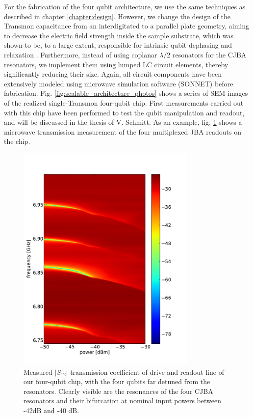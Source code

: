 For the fabrication of the four qubit architecture, we use the same techniques as described in chapter \ref{chapter:design}. However, we change the design of the Transmon capacitance from an interdigitated to a parallel plate geometry, aiming to decrease the electric field strength inside the sample substrate, which was shown to be, to a large extent, responsible for intrinsic qubit dephasing and relaxation \citep{paik_observation_2011}. Furthermore, instead of using coplanar $\lambda/2$ resonators for the CJBA resonators, we implement them using lumped LC circuit elements, thereby significantly reducing their size. Again, all circuit components have been extensively modeled using microwave simulation software (SONNET) before fabrication. Fig. \ref{fig:scalable_architecture_photos} shows a series of SEM images of the realized single-Transmon four-qubit chip. First measurements carried out with this chip have been performed to test the qubit manipulation and readout, and will be discussed in the thesis of V. Schmitt. As an example, fig. \ref{fig:jba_multiplexed_spectroscopy_main} shows a microwave transmission measurement of the four multiplexed JBA readouts on the chip.

\begin{figure}
	\centering
	\includegraphics[width=8.8cm]{"./data/scalable architecture/jba spectroscopy/spectro"}
	\caption[Measured $|S_{12}|$ transmission coefficient for the input transmission line of our four-qubit chip]{Measured $|S_{12}|$ transmission coefficient of drive and readout line of our four-qubit chip, with the four qubits far detuned from the resonators. Clearly visible are the resonances of the four CJBA resonators and their bifurcation at nominal input powers between -42dB and -40 dB.}
	\label{fig:jba_multiplexed_spectroscopy_main}
\end{figure}

